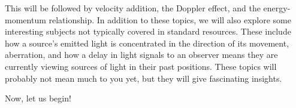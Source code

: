 This will be followed by velocity addition, the Doppler effect, and the energy-momentum relationship.
In addition to these topics, we will also explore some interesting subjects not typically covered in standard resources.
These include how a source's emitted light is concentrated in the direction of its movement, aberration, and how a delay in light signals to an observer means they are currently viewing sources of light in their past positions.
These topics will probably not mean much to you yet, but they will give fascinating insights.

Now, let us begin!

\newpage






